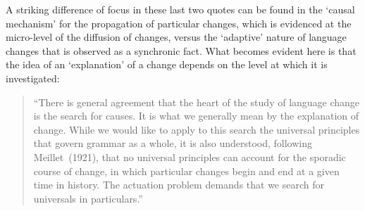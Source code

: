 
A striking difference of focus in these last two quotes can be found in the `causal mechanism' for the propagation of particular changes, which is evidenced at the micro-level of the diffusion of changes, versus the `adaptive' nature of language changes that is observed as a synchronic fact.
What becomes evident here is that the idea of an `explanation' of a change depends on the level at which it is investigated:

\begin{quote}
``There is general agreement that the heart of the study of language change is the search for causes. It is what we generally mean by the explanation of change. While we would like to apply to this search the universal principles that govern grammar as a whole, it is also understood, following Meillet~(1921), that no universal principles can account for the sporadic course of change, in which particular changes begin and end at a given time in history. The actuation problem demands that we search for universals in particulars.''~\citep[p.90]{Labov2010}
\end{quote}

